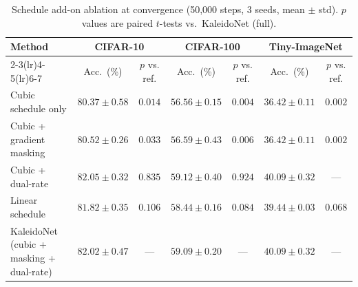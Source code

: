 \begin{table}[t]
\centering
\caption{Schedule add-on ablation at convergence (50{,}000 steps, 3 seeds, mean $\pm$ std). $p$ values are paired $t$-tests vs.\ KaleidoNet (full).}
\label{tab:ablation_schedule}
\small
\setlength{\tabcolsep}{4pt}
\begin{tabular}{lcccccc}
\toprule
\textbf{Method} & \multicolumn{2}{c}{\textbf{CIFAR-10}} & \multicolumn{2}{c}{\textbf{CIFAR-100}} & \multicolumn{2}{c}{\textbf{Tiny-ImageNet}} \\
\cmidrule(lr){2-3}\cmidrule(lr){4-5}\cmidrule(lr){6-7}
  & Acc.\ (\%) & $p$ vs. ref. & Acc.\ (\%) & $p$ vs. ref. & Acc.\ (\%) & $p$ vs. ref. \\
\midrule
Cubic schedule only & $80.37\pm0.58$ & $0.014$ & $56.56\pm0.15$ & $0.004$ & $36.42\pm0.11$ & $0.002$ \\
Cubic + gradient masking & $80.52\pm0.26$ & $0.033$ & $56.59\pm0.43$ & $0.006$ & $36.42\pm0.11$ & $0.002$ \\
Cubic + dual-rate & $82.05\pm0.32$ & $0.835$ & $59.12\pm0.40$ & $0.924$ & $40.09\pm0.32$ & --- \\
Linear schedule & $81.82\pm0.35$ & $0.106$ & $58.44\pm0.16$ & $0.084$ & $39.44\pm0.03$ & $0.068$ \\
KaleidoNet (cubic + masking + dual-rate) & $82.02\pm0.47$ & --- & $59.09\pm0.20$ & --- & $40.09\pm0.32$ & --- \\
\bottomrule
\end{tabular}
\end{table}

